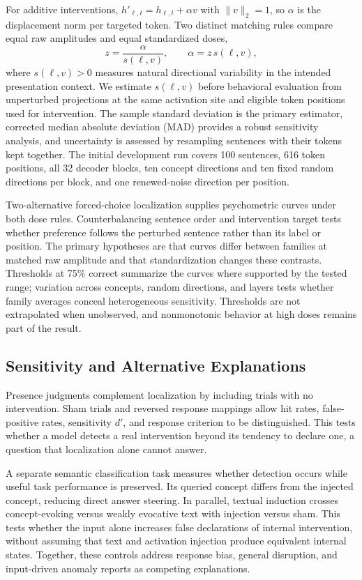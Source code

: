 For additive interventions, $h'_{\ell,t}=h_{\ell,t}+\alpha v$ with $\|v\|_2=1$, so $\alpha$ is the displacement norm per targeted token.
Two distinct matching rules compare equal raw amplitudes and equal standardized doses,
\begin{equation}
 z=\frac{\alpha}{s(\ell,v)},
 \qquad \alpha=z\,s(\ell,v),
 \label{eq:dose}
\end{equation}
where $s(\ell,v)>0$ measures natural directional variability in the intended presentation context.
We estimate $s(\ell,v)$ before behavioral evaluation from unperturbed projections at the same activation site and eligible token positions used for intervention.
The sample standard deviation is the primary estimator, corrected median absolute deviation (MAD) provides a robust sensitivity analysis, and uncertainty is assessed by resampling sentences with their tokens kept together.
The initial development run covers 100 sentences, 616 token positions, all 32 decoder blocks, ten concept directions and ten fixed random directions per block, and one renewed-noise direction per position.

Two-alternative forced-choice localization supplies psychometric curves under both dose rules.
Counterbalancing sentence order and intervention target tests whether preference follows the perturbed sentence rather than its label or position.
The primary hypotheses are that curves differ between families at matched raw amplitude and that standardization changes these contrasts.
Thresholds at 75\% correct summarize the curves where supported by the tested range; variation across concepts, random directions, and layers tests whether family averages conceal heterogeneous sensitivity.
Thresholds are not extrapolated when unobserved, and nonmonotonic behavior at high doses remains part of the result.

\subsection{Sensitivity and Alternative Explanations}

Presence judgments complement localization by including trials with no intervention.
Sham trials and reversed response mappings allow hit rates, false-positive rates, sensitivity $d'$, and response criterion to be distinguished.
This tests whether a model detects a real intervention beyond its tendency to declare one, a question that localization alone cannot answer.

A separate semantic classification task measures whether detection occurs while useful task performance is preserved.
Its queried concept differs from the injected concept, reducing direct answer steering.
In parallel, textual induction crosses concept-evoking versus weakly evocative text with injection versus sham.
This tests whether the input alone increases false declarations of internal intervention, without assuming that text and activation injection produce equivalent internal states.
Together, these controls address response bias, general disruption, and input-driven anomaly reports as competing explanations.

